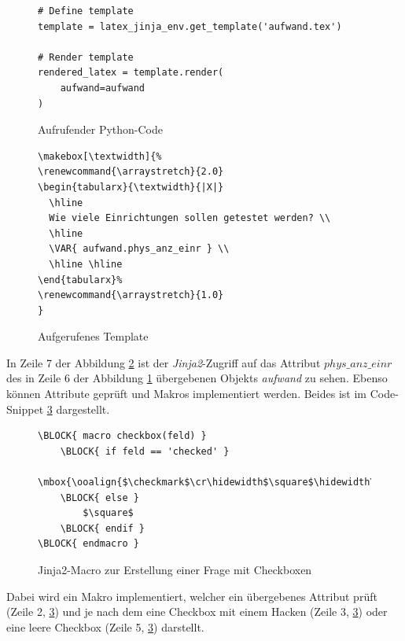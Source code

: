 \lstset{language=Python}
\begin{figure}[htbp]
\begin{lstlisting}
# Define template
template = latex_jinja_env.get_template('aufwand.tex')

# Render template
rendered_latex = template.render(
    aufwand=aufwand
)
\end{lstlisting}
\caption{Aufrufender Python-Code}
\label{ref:jinja2-py}
\end{figure}

\begin{figure}[htbp]
\lstset{language=Tex}
\begin{lstlisting}
\makebox[\textwidth]{%
\renewcommand{\arraystretch}{2.0}
\begin{tabularx}{\textwidth}{|X|}
  \hline
  Wie viele Einrichtungen sollen getestet werden? \\
  \hline
  \VAR{ aufwand.phys_anz_einr }	\\
  \hline \hline
\end{tabularx}%
\renewcommand{\arraystretch}{1.0}
}
\end{lstlisting}
\caption{Aufgerufenes Template}
\label{ref:aufwand.tex}
\end{figure}

\newpage
In Zeile 7 der Abbildung \ref{ref:aufwand.tex} ist der \textit{Jinja2}-Zugriff auf das Attribut \textit{$phys\_anz\_einr$} des in Zeile 6 der Abbildung \ref{ref:jinja2-py} übergebenen Objekts \textit{aufwand} zu sehen. Ebenso können Attribute geprüft und Makros implementiert werden. Beides ist im Code-Snippet \ref{ref:PenProzAufJinjaMacroCheck} dargestellt.\\

\begin{figure}
\begin{lstlisting}
\BLOCK{ macro checkbox(feld) }
    \BLOCK{ if feld == 'checked' }
        \mbox{\ooalign{$\checkmark$\cr\hidewidth$\square$\hidewidth\cr}}
    \BLOCK{ else }
        $\square$
    \BLOCK{ endif }
\BLOCK{ endmacro }
\end{lstlisting}
\caption{Jinja2-Macro zur Erstellung einer Frage mit Checkboxen}
\label{ref:PenProzAufJinjaMacroCheck}
\end{figure}

Dabei wird ein Makro implementiert, welcher ein übergebenes Attribut prüft (Zeile 2, \ref{ref:PenProzAufJinjaMacroCheck}) und je nach dem eine Checkbox mit einem Hacken (Zeile 3, \ref{ref:PenProzAufJinjaMacroCheck}) oder eine leere Checkbox (Zeile 5, \ref{ref:PenProzAufJinjaMacroCheck}) darstellt.

